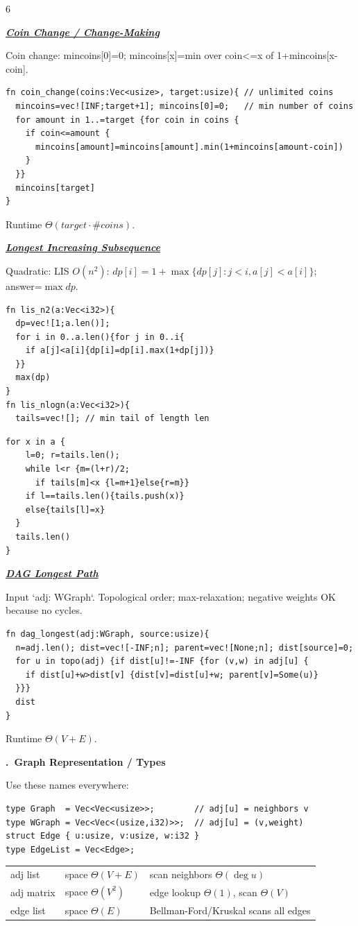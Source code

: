 \documentclass[a4paper,landscape]{article}
\renewcommand{\textbf}[1]{\underline{#1}}
\newcommand{\subsectionsize}{\fontsize{3.92}{4.02}\selectfont}
\newcommand{\sectionsize}{\fontsize{4.55}{4.65}\selectfont}
\newcounter{cheatsection}
\newcommand{\sectiontitle}[1]{%
  \par\vspace{0pt}%
  \noindent{\rule{\linewidth}{0.25pt}}\par%
  \vspace{0pt}%
  \refstepcounter{cheatsection}%
  {\sectionsize\bfseries \arabic{cheatsection}.\ #1}\par%
  \vspace{0pt}%
}
\newcommand{\subsectiontitle}[1]{%
  \par\vspace{0pt}%
  {\subsectionsize\bfseries\itshape\textbf{#1}}\par%
  \vspace{0pt}%
}
\begin{document}
\begin{multicols*}{6}
\subsectiontitle{Coin Change / Change-Making}
Coin change: mincoins[0]=0; mincoins[x]=min over coin<=x of 1+mincoins[x-coin].
\begin{lstlisting}[aboveskip=0pt,belowskip=0pt]
fn coin_change(coins:Vec<usize>, target:usize){ // unlimited coins
  mincoins=vec![INF;target+1]; mincoins[0]=0;   // min number of coins
  for amount in 1..=target {for coin in coins {
    if coin<=amount {
      mincoins[amount]=mincoins[amount].min(1+mincoins[amount-coin])
    }
  }}
  mincoins[target]
}
\end{lstlisting}
Runtime $\Theta(target\cdot \#coins)$.

\subsectiontitle{Longest Increasing Subsequence}
Quadratic:
LIS $O(n^2)$: $dp[i]=1+\max\{dp[j]:j<i, a[j]<a[i]\}$; answer=$\max dp$.\\
\noindent
\begin{minipage}[t]{0.49\linewidth}\vspace{0pt}
\begin{lstlisting}[aboveskip=0pt,belowskip=0pt]
fn lis_n2(a:Vec<i32>){
  dp=vec![1;a.len()];
  for i in 0..a.len(){for j in 0..i{
    if a[j]<a[i]{dp[i]=dp[i].max(1+dp[j])}
  }}
  max(dp)
}
fn lis_nlogn(a:Vec<i32>){
  tails=vec![]; // min tail of length len
\end{lstlisting}
\end{minipage}\hfill
\begin{minipage}[t]{0.49\linewidth}\vspace{0pt}
\begin{lstlisting}[aboveskip=0pt,belowskip=0pt]
  for x in a {
    l=0; r=tails.len();
    while l<r {m=(l+r)/2;
      if tails[m]<x {l=m+1}else{r=m}}
    if l==tails.len(){tails.push(x)}
    else{tails[l]=x}
  }
  tails.len()
}
\end{lstlisting}
\end{minipage}

\subsectiontitle{DAG Longest Path}
Input `adj: WGraph`. Topological order; max-relaxation; negative weights OK because no cycles.
\begin{lstlisting}[aboveskip=0pt,belowskip=0pt]
fn dag_longest(adj:WGraph, source:usize){
  n=adj.len(); dist=vec![-INF;n]; parent=vec![None;n]; dist[source]=0;
  for u in topo(adj) {if dist[u]!=-INF {for (v,w) in adj[u] {
    if dist[u]+w>dist[v] {dist[v]=dist[u]+w; parent[v]=Some(u)}
  }}}
  dist
}
\end{lstlisting}
Runtime $\Theta(V+E)$.
\sectiontitle{Graph Representation / Types}
Use these names everywhere:
\begin{lstlisting}[aboveskip=0pt,belowskip=0pt]
type Graph  = Vec<Vec<usize>>;        // adj[u] = neighbors v
type WGraph = Vec<Vec<(usize,i32)>>;  // adj[u] = (v,weight)
struct Edge { u:usize, v:usize, w:i32 }
type EdgeList = Vec<Edge>;
\end{lstlisting}
\begin{tabular}{@{}lll@{}}
adj list & space $\Theta(V+E)$ & scan neighbors $\Theta(\deg u)$ \\
adj matrix & space $\Theta(V^2)$ & edge lookup $\Theta(1)$, scan $\Theta(V)$ \\
edge list & space $\Theta(E)$ & Bellman-Ford/Kruskal scans all edges
\end{tabular}



\end{multicols*}
\end{document}
